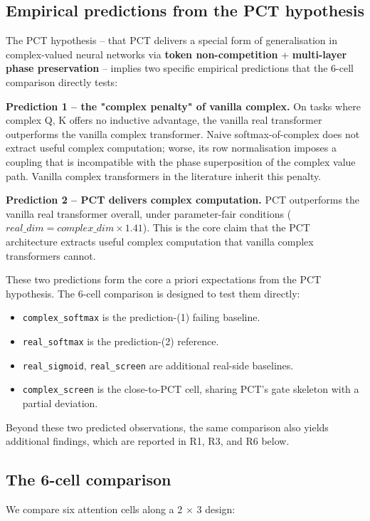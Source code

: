 \documentclass[11pt,a4paper]{article}
\theoremstyle{plain}
\theoremstyle{definition}
\begin{document}
\subsection{Empirical predictions from the PCT hypothesis}
The PCT hypothesis -- that PCT delivers a special form of generalisation in complex-valued neural networks via \textbf{token non-competition} + \textbf{multi-layer phase preservation} -- implies two specific empirical predictions that the 6-cell comparison directly tests:

\textbf{Prediction 1 -- the "complex penalty" of vanilla complex.} On tasks where complex Q, K offers no inductive advantage, the vanilla real transformer outperforms the vanilla complex transformer. Naive softmax-of-complex does not extract useful complex computation; worse, its row normalisation imposes a coupling that is incompatible with the phase superposition of the complex value path. Vanilla complex transformers in the literature inherit this penalty.

\textbf{Prediction 2 -- PCT delivers complex computation.} PCT outperforms the vanilla real transformer overall, under parameter-fair conditions ($real\_dim = complex\_dim \times 1.41$). This is the core claim that the PCT architecture extracts useful complex computation that vanilla complex transformers cannot.

These two predictions form the core a priori expectations from the PCT hypothesis. The 6-cell comparison is designed to test them directly:

\begin{itemize}
  \item \texttt{complex\_softmax} is the prediction-(1) failing baseline.
  \item \texttt{real\_softmax} is the prediction-(2) reference.
  \item \texttt{real\_sigmoid}, \texttt{real\_screen} are additional real-side baselines.
  \item \texttt{complex\_screen} is the close-to-PCT cell, sharing PCT's gate skeleton with a partial deviation.
\end{itemize}

Beyond these two predicted observations, the same comparison also yields additional findings, which are reported in R1, R3, and R6 below.

\subsection{The 6-cell comparison}
We compare six attention cells along a 2 $\times$ 3 design:
\end{document}
